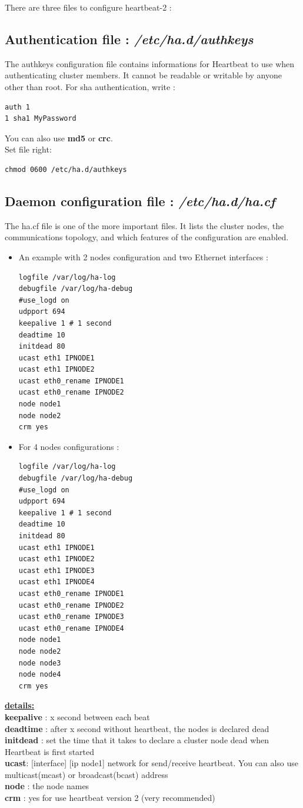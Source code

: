 \documentclass[a4paper,10pt]{report}
\begin{document}
There are three files to configure heartbeat-2 :
\subsection{Authentication file : \textit{/etc/ha.d/authkeys}}
The authkeys configuration file contains informations for Heartbeat to use when authenticating cluster members. It cannot be readable or writable by anyone other than root. For sha authentication, write :
\begin{lstlisting}
auth 1
1 sha1 MyPassword
\end{lstlisting}
You can also use \textbf{md5} or \textbf{crc}.\\
Set file right:
\begin{lstlisting}
chmod 0600 /etc/ha.d/authkeys
\end{lstlisting}

\subsection{Daemon configuration file : \textit{/etc/ha.d/ha.cf}}

The ha.cf file is one of the more important files. It lists the cluster nodes, the communications topology, and which features of the configuration are enabled. 
\begin{itemize}
\item An example with 2 nodes configuration and two Ethernet interfaces :
\begin{lstlisting}
logfile /var/log/ha-log
debugfile /var/log/ha-debug
#use_logd on
udpport 694
keepalive 1 # 1 second
deadtime 10
initdead 80
ucast eth1 IPNODE1
ucast eth1 IPNODE2
ucast eth0_rename IPNODE1
ucast eth0_rename IPNODE2
node node1
node node2
crm yes
\end{lstlisting}

\item For 4 nodes configurations :
\begin{lstlisting}
logfile /var/log/ha-log
debugfile /var/log/ha-debug
#use_logd on
udpport 694
keepalive 1 # 1 second
deadtime 10
initdead 80
ucast eth1 IPNODE1
ucast eth1 IPNODE2
ucast eth1 IPNODE3
ucast eth1 IPNODE4
ucast eth0_rename IPNODE1
ucast eth0_rename IPNODE2
ucast eth0_rename IPNODE3
ucast eth0_rename IPNODE4
node node1
node node2
node node3
node node4
crm yes
\end{lstlisting}
\end{itemize}

\textbf{\underline{details:}}\\
\textbf{keepalive} : x second between each beat\\
\textbf{deadtime} : after x second without heartbeat, the nodes is declared dead\\
\textbf{initdead} : set the time that it takes to declare a cluster node dead when Heartbeat is first started\\
\textbf{ucast}: [interface] [ip node1] network for send/receive heartbeat. You can also use multicast(mcast) or broadcast(bcast) address\\
\textbf{node} : the node names\\
\textbf{crm} : yes for use heartbeat version 2 (very recommended)\\
\end{document}
